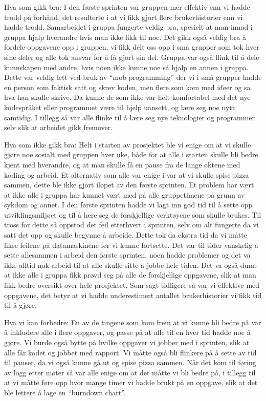 \documentclass[12pt,a4paper,norsk]{article}
\begin{document}
Hva som gikk bra:
I den første sprinten var gruppen mer effektiv enn vi hadde trodd på forhånd, det resulterte i at vi fikk gjort flere brukerhistorier enn vi hadde trodd. Samarbeidet i gruppa fungerte veldig bra, spesielt at man innad i gruppa hjalp hverandre hvis man ikke fikk til noe. Det gikk også veldig bra å fordele oppgavene opp i gruppen, vi fikk delt oss opp i små grupper som tok hver sine deler og alle tok ansvar for å få gjort sin del. Gruppa var også flink til å dele kunnskapen med andre, hvis noen ikke kunne noe så hjalp en annen i gruppa. Dette var veldig lett ved bruk av “mob programming” der vi i små grupper hadde en person som faktisk satt og skrev koden, men flere som kom med ideer og sa hva han skulle skrive. Da kunne de som ikke var helt komfortabel med det nye kodespråket eller programmet være til hjelp uansett, og lære seg noe nytt samtidig. I tillegg så var alle flinke til å lære seg nye teknologier og programmer selv slik at arbeidet gikk fremover. 

Hva som ikke gikk bra:
Helt i starten av prosjektet ble vi enige om at vi skulle gjøre noe sosialt med gruppen hver uke, både for at alle i starten skulle bli bedre kjent med hverandre, og at man skulle få en pause fra de lange øktene med koding og arbeid. Et alternativ som alle var enige i var at vi skulle spise pizza sammen, dette ble ikke gjort iløpet av den første sprinten.  
Et problem har vært at ikke alle i gruppa har kunnet vært med på alle gruppetimene på grunn av sykdom og annet. 
I den første sprinten hadde vi lagt inn god tid til å sette opp utviklingsmiljøet og til å lære seg de forskjellige verktøyene som skulle brukes. Til tross for dette så oppstod det feil etterhvert i sprinten, selv om alt fungerte da vi satt det opp og skulle begynne å arbeide. Dette tok da ekstra tid da vi måtte fikse feilene på datamaskinene før vi kunne fortsette. 
Det var til tider vanskelig å sette allesammen i arbeid den første sprinten, noen hadde problemer og det va ikke alltid nok arbeid til at alle skulle sitte å jobbe hele tiden. Det va også dumt at ikke alle i gruppa fikk prøvd seg på alle de forskjellige oppgavene, slik at man fikk bedre oversikt over hele prosjektet. 
Som sagt tidligere så var vi effektive med oppgavene, det betyr at vi hadde underestimert antallet brukerhistorier vi fikk tid til å gjøre.


Hva vi kan forbedre:
En av de tingene som kom frem at vi kunne bli bedre på var å inkludere alle i flere oppgaver, og passe på at alle til en hver tid hadde noe å gjøre. Vi burde også bytte på hvilke oppgaver vi jobber med i sprinten, slik at alle får kodet og jobbet med rapport.
Vi måtte også bli flinkere på å sette av tid til pauser, da vi også kunne gå ut og spise pizza sammen. 
Når det kom til føring av logg etter møter så var alle enige om at det måtte vi bli bedre på, i tillegg til at vi måtte føre opp hvor mange timer vi hadde brukt på en oppgave, slik at det ble lettere å lage en “burndown chart”.
\end{document}
